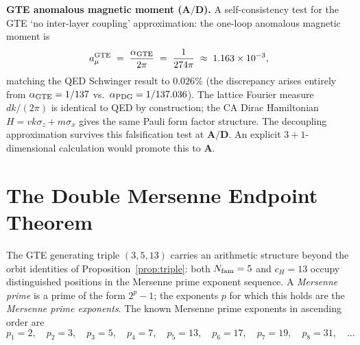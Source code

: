 \documentclass[11pt]{article}
\theoremstyle{remark}
\newcommand{\Nfam}{N_{\rm fam}}
\newcommand{\cH}{c_H}
\newcommand{\CatA}{\textbf{A}}
\newcommand{\CatAD}{\textbf{A/D}}
\begin{document}
\medskip

\textbf{GTE anomalous magnetic moment ($\CatAD$).}
A self-consistency test for the GTE `no inter-layer coupling' approximation:
the one-loop anomalous magnetic moment is
\begin{equation}
  a_\mu^{\rm GTE} \;=\; \frac{\alpha_{\rm GTE}}{2\pi}
  \;=\; \frac{1}{274\pi} \;\approx\; 1.163\times 10^{-3},
\end{equation}
matching the QED Schwinger result to $0.026\%$ (the discrepancy arises entirely from
$\alpha_{\rm GTE} = 1/137$ vs.\ $\alpha_{\rm PDG} = 1/137.036$).
The lattice Fourier measure $dk/(2\pi)$ is identical to QED by construction; the CA
Dirac Hamiltonian $H = vk\sigma_z + m\sigma_x$ gives the same Pauli form factor
structure.  The decoupling approximation survives this falsification test at $\CatAD$.
An explicit $3{+}1$-dimensional calculation would promote this to $\CatA$.

\section{The Double Mersenne Endpoint Theorem}
\label{sec:mersenne_endpoint}

The GTE generating triple $(3, 5, 13)$ carries an arithmetic structure beyond the
orbit identities of Proposition~\ref{prop:triple}: both $\Nfam = 5$ and $\cH = 13$
occupy distinguished positions in the Mersenne prime exponent sequence.
A \emph{Mersenne prime} is a prime of the form $2^p - 1$; the exponents $p$ for which
this holds are the \emph{Mersenne prime exponents}.  The known Mersenne prime exponents
in ascending order are
\[
  p_1 = 2,\quad p_2 = 3,\quad p_3 = 5,\quad p_4 = 7,\quad p_5 = 13,\quad
  p_6 = 17,\quad p_7 = 19,\quad p_8 = 31,\quad \ldots
\]
\end{document}
